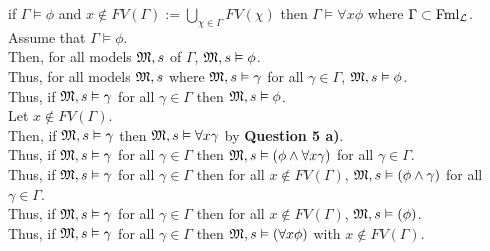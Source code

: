 \documentclass[11pt,a4paper]{article}
\begin{document}
\qpartnb if $\Gamma\vDash\phi$ and $x\not\in FV(\Gamma):=\bigcup\limits_{\chi\in\Gamma}FV(\chi)$ then $\Gamma\vDash\forall x\phi$ where $\Gamma\subset\text{Fml}_{\mathcal{L}}$.\\


\apart
Assume that $\Gamma\vDash\phi$.\\
Then, for all models $\mathfrak{M},s$ of $\Gamma$, $\mathfrak{M},s\vDash\phi$.\\
Thus, for all models $\mathfrak{M},s$ where $\mathfrak{M},s\vDash\gamma$ for all $\gamma\in\Gamma$, $\mathfrak{M},s\vDash\phi$.\\
Thus, if $\mathfrak{M},s\vDash\gamma$ for all $\gamma\in\Gamma$ then $\mathfrak{M},s\vDash\phi$.\\
Let $x\not\in FV(\Gamma)$.\\
Then, if $\mathfrak{M},s\vDash\gamma$ then $\mathfrak{M},s\vDash\forall x\gamma$ by \textbf{Question 5 a)}.\\
Thus, if $\mathfrak{M},s\vDash\gamma$ for all $\gamma\in\Gamma$ then $\mathfrak{M},s\vDash(\phi\wedge\forall x\gamma)$ for all $\gamma\in\Gamma$.\\
Thus, if $\mathfrak{M},s\vDash\gamma$ for all $\gamma\in\Gamma$ then for all $x\not\in FV(\Gamma)$, $\mathfrak{M},s\vDash(\phi\wedge\gamma)$ for all $\gamma\in\Gamma$.\\
Thus, if $\mathfrak{M},s\vDash\gamma$ for all $\gamma\in\Gamma$ then for all $x\not\in FV(\Gamma)$, $\mathfrak{M},s\vDash(\phi)$.\\
Thus, if $\mathfrak{M},s\vDash\gamma$ for all $\gamma\in\Gamma$ then $\mathfrak{M},s\vDash(\forall x\phi)$ with $x\not\in FV(\Gamma)$.
\end{document}
